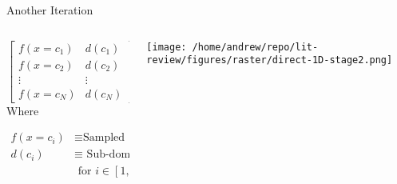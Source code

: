 \documentclass[presentation, aspectratio=1610]{beamer}
\begin{document}
\begin{frame}[label={sec:orge8b2e5a}]{Another Iteration}
\begin{columns}
\begin{column}{0.4\columnwidth}
\begin{equation*}
  \begin{bmatrix}
    f(x=c_{1}) & d(c_{1})\\
    f(x=c_{2}) & d(c_{2})\\
    \vdots & \vdots \\
    f(x=c_{N}) & d(c_{N})
  \end{bmatrix}
\end{equation*}
Where

\begin{align*}
  f(x=c_{i}) &\equiv \text{Sampled function value} \\
  d(c_{i}) & \equiv \text{ Sub-domain size } \\
  & \text{ for } i \in [1,N]
\end{align*}
\end{column}

\begin{column}{0.6\columnwidth}
\begin{center}
\texttt{[image: /home/andrew/repo/lit-review/figures/raster/direct-1D-stage2.png]}
\end{center}
\end{column}
\end{columns}
\end{frame}
\end{document}
